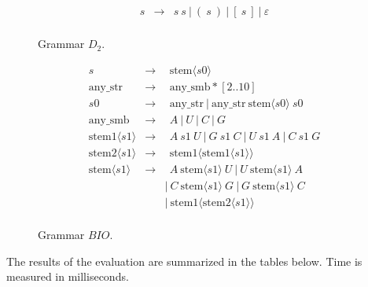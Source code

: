 \vspace{-10pt}
\begin{figure}
\centering
\begin{minipage}{0.5\textwidth}
	\[
	\begin{array}{rcl}
	s & \rightarrow & s \ s \ | \ ( \ s \ ) \ | \ [ \ s \ ] \ | \ \varepsilon \\
	\end{array}
	\]
	\caption{Grammar $D_2$.}
	\label{d2}
\end{minipage}
\hfill
\begin{minipage}{0.5\textwidth}
	\[
	\begin{array}{rcl}
            s & \rightarrow & \ \ \text{stem}\langle s0 \rangle \\
            \text{any\_str} & \rightarrow & \ \ \text{any\_smb}*[2..10] \\
            s0 & \rightarrow & \ \ \text{any\_str} \ | \ \text{any\_str} \ \text{stem}\langle s0 \rangle \ s0 \\
            \text{any\_smb} & \rightarrow &  \ \ A \ | \ U \ | \ C \ | \  G \\
            \text{stem1}\langle s1 \rangle & \rightarrow & \ \ A \ s1 \  U \ | \ G \ s1 \ C \ | \ U \ s1 \ A \ | \ C \ s1 \ G \\
            \text{stem2}\langle s1 \rangle & \rightarrow & \ \ \text{stem1}\langle \text{stem1}\langle s1 \rangle \rangle \\
            \text{stem}\langle s1 \rangle & \rightarrow & \ \ A \ \text{stem}\langle s1 \rangle \ U
              \ | \ U \ \text{stem}\langle s1 \rangle \ A \\
              & &    | \ C \ \text{stem}\langle s1 \rangle \ G
              \ | \ G \ \text{stem}\langle s1 \rangle \ C \\
              & &    | \ \text{stem1}\langle \text{stem2}\langle s1 \rangle \rangle \\
    \end{array}
	\]
	\caption{Grammar $BIO$.}
	\label{bio}
\end{minipage}
\end{figure}

\vspace{-10pt}
The results of the evaluation are summarized in the tables below.
Time is measured in milliseconds.

